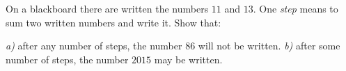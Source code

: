 On a blackboard there are written the numbers $ 11 $ and $ 13. $ One \textit{step} means to sum two written numbers and write it. Show that:

\textit{a)} after any number of steps, the number $ 86 $ will not be written.
\textit{b)} after some number of steps, the number $ 2015 $ may be written.